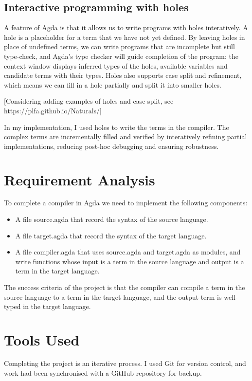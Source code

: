 \documentclass[12pt,twoside,a4paper]{report}
\theoremstyle{definition}
\theoremstyle{definition}
\begin{document}
        
        \subsection{Interactive programming with holes} \label{subsec: holes}
        A feature of Agda is that it allows us to write programs with holes interatively. A hole is a placeholder for a term that we have not yet defined. By leaving holes in place of undefined terms, we can write programs that are incomplete but still type-check, and Agda's type checker will guide completion of the program: the context window displays inferred types of the holes, available variables and candidate terms with their types. Holes also supports case split and refinement, which means we can fill in a hole partially and split it into smaller holes. 

        [Considering adding examples of holes and case split, see https://plfa.github.io/Naturals/]

        In my implementation, I used holes to write the terms in the compiler. The complex terms are incrementally filled and verified by interatively refining partial implementations, reducing post-hoc debugging and ensuring robustness.


    \section{Requirement Analysis}
    To complete a compiler in Agda we need to implement the following components:
    \begin{itemize}
        \item 
            A file source.agda that record the syntax of the source language.

        \item
            A file target.agda that record the syntax of the target language.

        \item
            A file compiler.agda that uses source.agda and target.agda as modules, and write functions whose input is a term in the source language and output is a term in the target language.
    \end{itemize}
    The success criteria of the project is that the compiler can compile a term in the source language to a term in the target language, and the output term is well-typed in the target language.


    \section{Tools Used}
    Completing the project is an iterative process. I used Git \cite{git} for version control, and work had been synchronised with a GitHub \cite{github} repository for backup.
\end{document}
